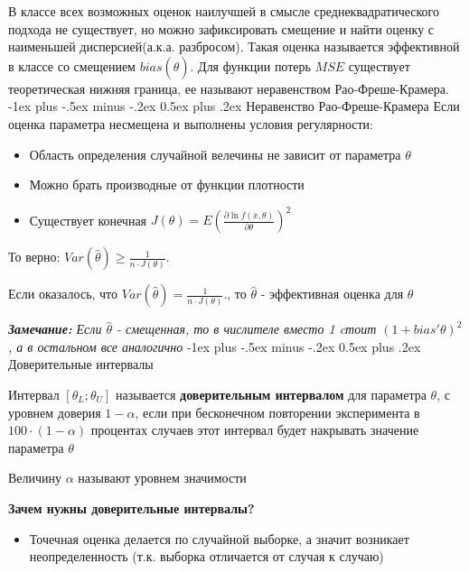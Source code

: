 \documentclass[10pt,landscape]{article}
\makeatletter
\renewcommand{\section}{\@startsection{section}{1}{0mm}%
                                {-1ex plus -.5ex minus -.2ex}%
                                {0.5ex plus .2ex}%
                                {\normalfont\large\bfseries}}
\makeatother
\begin{document}
\begin{multicols}{3}
В классе всех возможных оценок наилучшей в смысле среднеквадратического подхода не существует, но можно зафиксировать смещение и найти оценку с наименьшей дисперсией(а.к.а. разбросом). Такая оценка называется эффективной в классе со смещением $bias(\hat\theta)$. Для функции потерь $MSE$ существует теоретическая нижняя граница, ее называют неравенством Рао-Фреше-Крамера.
\section{Неравенство Рао-Фреше-Крамера}
Если оценка параметра несмещена и выполнены условия регулярности:
\begin{itemize}
    \item Область определения случайной велечины не зависит от параметра $\theta$
    \item Можно брать производные от функции плотности
    \item Существует конечная $J(\theta) = E(\frac{\partial \ln f(x, \theta)}{\partial \theta})^2$
\end{itemize}
То верно: $Var(\hat \theta) \geq \frac{1}{n \cdot J(\theta)}$. 

Если оказалось, что  $Var(\hat \theta) = \frac{1}{n \cdot J(\theta)}$., то $\hat \theta$ - эффективная оценка для $\theta$

\textbf{\textit{Замечание:}} \textit{Если $\hat\theta$ - смещенная, то в числителе вместо 1 cтоит $(1+bias'\theta)^2$, а в остальном все аналогично}
\section{Доверительные интервалы}

Интервал $[\theta_L; \theta_U]$ называется \textbf{доверительным интервалом} для параметра \textbf{$\theta$}, с уровнем доверия \textbf{$1-\alpha$}, если при бесконечном повторении эксперимента в $100\cdot(1-\alpha)$ процентах случаев этот интервал будет накрывать значение параметра $\theta$

Величину $\alpha$ называют уровнем значимости



\textbf{Зачем нужны доверительные интервалы?}

\begin{itemize}

\item Точечная оценка делается по случайной выборке, а значит возникает неопределенность (т.к. выборка отличается от случая к случаю)


\end{itemize}
\end{multicols}
\end{document}
